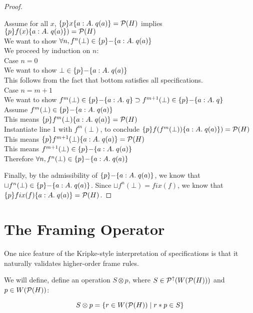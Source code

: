 \begin{proof}
\begin{tabbedproof}
\oo Assume for all $x$, $\{{p}\}{x}\{{a:A}.\;{q(a)}\} = \mathcal{P}(H)$ implies $\{{p}\}{f(x)}\{{a:A}.\;{q(a)}\}) = \mathcal{P}(H)$ \\
\ooo We want to show $\forall n, f^n(\bot) \in \{{p}\}{-}\{{a:A}.\;{q(a)}\}$ \\ 
\ooo We proceed by induction on $n$: \\
\oooo Case $n = 0$ \\
\ooooo We want to show $\bot \in \{{p}\}{-}\{{a:A}.\;{q(a)}\}$ \\
\ooooo This follows from the fact that bottom satisfies all specifications. \\
\oooo Case $n = m + 1$ \\
\ooooo We want to show $f^m(\bot) \in \{{p}\}{-}\{{a:A}.\;{q}\} \supset
                        f^{m+1}(\bot) \in \{{p}\}{-}\{{a:A}.\;{q}\}$ \\
\ooooo Assume $f^m(\bot) \in \{{p}\}{-}\{{a:A}.\;{q(a)}\}$ \\
\oooooo This means $\{{p}\}{f^m(\bot)}\{{a:A}.\;{q(a)}\} = \mathcal{P}(H)$ \\
\oooooo Instantiate line 1 with $f^m(\bot)$, to conclude
          $\{{p}\}{f(f^m(\bot))}\{{a:A}.\;{q(a)}\}) = \mathcal{P}(H)$ \\
\oooooo This means $\{{p}\}{f^{m+1}(\bot)}\{{a:A}.\;{q(a)}\} = \mathcal{P}(H)$ \\
\oooooo This means $f^{m+1}(\bot) \in \{{p}\}{-}\{{a:A}.\;{q(a)}\}$ \\
\ooo Therefore $\forall n, f^n(\bot) \in \{{p}\}{-}\{{a:A}.\;{q(a)}\}$ \\ 
\end{tabbedproof}
Finally, by the admissibility of $\{{p}\}{-}\{{a:A}.\;{q(a)}\}$, we know that
$\sqcup f^n(\bot) \in \{{p}\}{-}\{{a:A}.\;{q(a)}\}$. Since $\sqcup f^n(\bot) = fix(f)$, we 
know that $\{{p}\}{fix(f)}\{{a:A}.\;{q(a)}\} = \mathcal{P}(H)$. 
\end{proof}



\section{The Framing Operator}

One nice feature of the Kripke-style interpretation of specifications
is that it naturally validates higher-order frame rules.

We will define, define an operation $S \otimes p$, where $S \in \mathcal{P}^{\uparrow}({W(\mathcal{P}(H))})$ and
$p \in W(\mathcal{P}(H))$:

\begin{displaymath}
S \otimes p = \{{{ r \in W(\mathcal{P}(H)) }\;|\;{ r * p \in S }}\}
\end{displaymath}

